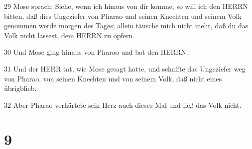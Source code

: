 \par 29 Mose sprach: Siehe, wenn ich hinaus von dir komme, so will ich den HERRN bitten, daß dies Ungeziefer von Pharao und seinen Knechten und seinem Volk genommen werde morgen des Tages; allein täusche mich nicht mehr, daß du das Volk nicht lassest, dem HERRN zu opfern.
\par 30 Und Mose ging hinaus von Pharao und bat den HERRN.
\par 31 Und der HERR tat, wie Mose gesagt hatte, und schaffte das Ungeziefer weg von Pharao, von seinen Knechten und von seinem Volk, daß nicht eines übrigblieb.
\par 32 Aber Pharao verhärtete sein Herz auch dieses Mal und ließ das Volk nicht.

\chapter{9}

